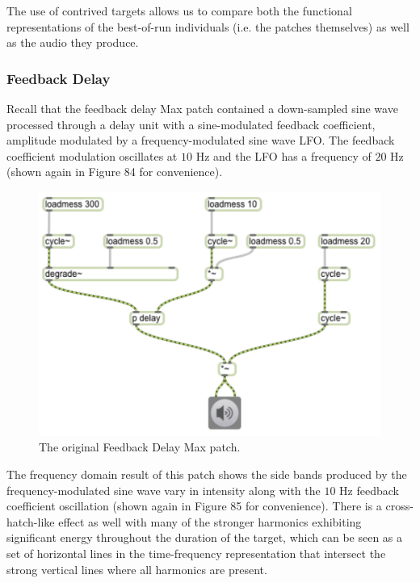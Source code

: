 \documentclass[12pt]{report} 	%
\numberwithin{figure}{chapter}
\numberwithin{table}{chapter}
\numberwithin{equation}{chapter}
\begin{document}
\begin{flushleft}
The use of contrived targets allows us to compare both the functional representations of the best-of-run individuals (i.e. the patches themselves) as well as the audio they produce.

\vspace{12pt}
\subsubsection{Feedback Delay}
Recall that the feedback delay Max patch contained a down-sampled sine wave processed through a delay unit with a sine-modulated feedback coefficient, amplitude modulated by a frequency-modulated sine wave LFO. The feedback coefficient modulation oscillates at $10$ Hz and the LFO has a frequency of $20$ Hz (shown again in Figure 84 for convenience).
\begin{figure}[h!]
\begin{center}
\includegraphics[scale=0.8]{DelayFeedbackAM}
\caption[Original feedback delay Max patch]{The original Feedback Delay Max patch.}
\end{center}
\vspace{6pt}
\end{figure}
The frequency domain result of this patch shows the side bands produced by the frequency-modulated sine wave vary in intensity along with the $10$ Hz feedback coefficient oscillation (shown again in Figure 85 for convenience). There is a cross-hatch-like effect as well with many of the stronger harmonics exhibiting significant energy throughout the duration of the target, which can be seen as a set of horizontal lines in the time-frequency representation that intersect the strong vertical lines where all harmonics are present.

\end{flushleft}
\end{document}
